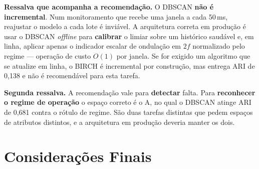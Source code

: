 \documentclass[12pt,a4paper]{article}
\begin{document}
\textbf{Ressalva que acompanha a recomendação.} O DBSCAN \textbf{não é incremental}. Num monitoramento que recebe uma janela a cada 50\,ms, reajustar o modelo a cada lote é inviável. A arquitetura correta em produção é usar o DBSCAN \emph{offline} para \textbf{calibrar} o limiar sobre um histórico saudável e, em linha, aplicar apenas o indicador escalar de ondulação em $2f$ normalizado pelo regime --- operação de custo $O(1)$ por janela. Se for exigido um algoritmo que se atualize em linha, o BIRCH é incremental por construção, mas entrega ARI de 0,138 e não é recomendável para esta tarefa.

\textbf{Segunda ressalva.} A recomendação vale para \textbf{detectar} falta. Para \textbf{reconhecer o regime de operação} o espaço correto é o A, no qual o DBSCAN atinge ARI de 0,681 contra o rótulo de regime. São duas tarefas distintas que pedem espaços de atributos distintos, e a arquitetura em produção deveria manter os dois.

\newpage
\section{Considerações Finais}
\end{document}
